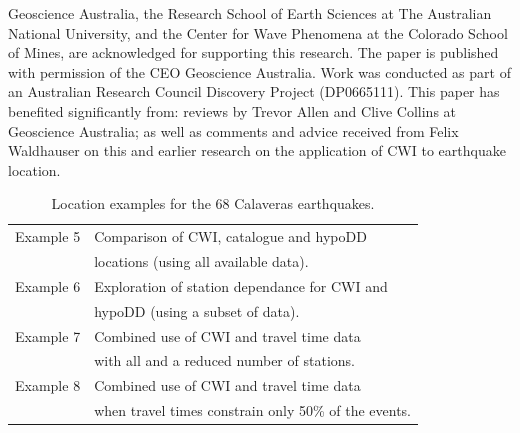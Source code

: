 \documentclass[extra, onecolumn, doublespacing]{gji}
\begin{document}
\begin{acknowledgments}
Geoscience Australia, the Research School of Earth Sciences at The
Australian National University, and the Center for Wave Phenomena at
the Colorado School of Mines, are acknowledged for supporting this
research. The paper is published with permission of the CEO
Geoscience Australia. Work was conducted as part of an Australian
Research Council Discovery Project (DP0665111).  This paper has
benefited significantly from: reviews by Trevor Allen and Clive Collins
at Geoscience Australia; as well as comments and advice received from
Felix Waldhauser on this and earlier research on the application of
CWI to earthquake location.
\end{acknowledgments}




\clearpage


\begin{table}
\caption{Location examples for the 68 Calaveras earthquakes.}
\label{tab:examples}
\begin{tabular}{ll}
\hline
Example 5 & Comparison of CWI, catalogue and hypoDD \\
 & locations (using all available data). \\
Example 6 & Exploration of station dependance for CWI and \\
 & hypoDD (using a subset of data). \\
Example 7 & Combined use of CWI and travel time data \\
& with all and a reduced number of stations. \\
Example 8 & Combined use of CWI and travel time data \\
 & when travel times constrain only 50\% of the events. \\
 \hline
\end{tabular}
\end{table}

\end{document}
